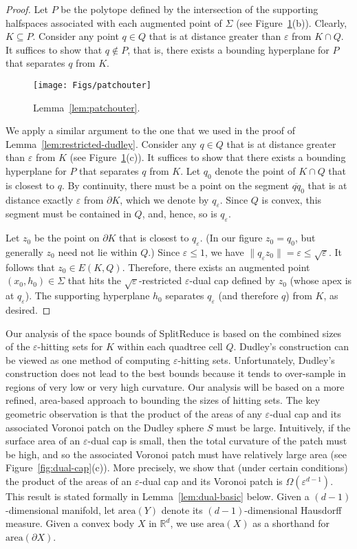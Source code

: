 \documentclass[11pt]{article}   \usepackage[letterpaper,hmargin=2.1cm,vmargin=3cm]{geometry}
\newcommand{\RE}{\mathbb{R}}    \newcommand{\ZZ}{\mathbb{Z}}    \newcommand{\eps}{\varepsilon}  \newcommand{\ST}{\,:\,}         \newcommand{\sq}{\square}
\newcommand{\alg}{\textrm{SplitReduce}}
\newcommand{\area}{\mathrm{area}}
\begin{document}
\begin{proof}
Let $P$ be the polytope defined by the intersection of the supporting halfspaces associated with each augmented point of $\Sigma$ (see Figure~\ref{fig:patchouter}(b)). Clearly, $K \subseteq P$. Consider any point $q \in Q$ that is at distance greater than $\eps$ from $K \cap Q$. It suffices to show that $q \notin P$, that is, there exists a bounding hyperplane for $P$ that separates $q$ from $K$. 

\begin{figure}[htbp]
  \centerline{\texttt{[image: Figs/patchouter]}}
  \caption{Lemma~\ref{lem:patchouter}.}
  \label{fig:patchouter}
\end{figure}


We apply a similar argument to the one that we used in the proof of Lemma~\ref{lem:restricted-dudley}. Consider any $q \in Q$ that is at distance greater than $\eps$ from $K$ (see Figure~\ref{fig:patchouter}(c)). It suffices to show that there exists a bounding hyperplane for $P$ that separates $q$ from $K$. Let $q_0$ denote the point of $K \cap Q$ that is closest to $q$. By continuity, there must be a point on the segment $\overline{q q}_0$ that is at distance exactly $\eps$ from $\partial K$, which we denote by $q_{\eps}$. Since $Q$ is convex, this segment must be contained in $Q$, and, hence, so is $q_{\eps}$. 

Let $z_0$ be the point on $\partial K$ that is closest to $q_{\eps}$. (In our figure $z_0 = q_0$, but generally $z_0$ need not lie within $Q$.) Since $\eps \le 1$, we have $\|q_{\eps} z_0\| = \eps \le \sqrt{\eps}$. It follows that $z_0 \in E(K,Q)$. Therefore, there exists an augmented point $(x_0,h_0) \in \Sigma$ that hits the $\sqrt{\eps}$-restricted $\eps$-dual cap defined by $z_0$ (whose apex is at $q_{\eps}$). The supporting hyperplane $h_0$ separates $q_{\eps}$ (and therefore $q$) from $K$, as desired.
\end{proof}


Our analysis of the space bounds of {\alg} is based on the combined sizes of the $\eps$-hitting sets for $K$ within each quadtree cell $Q$. Dudley's construction can be viewed as one method of computing $\eps$-hitting sets. Unfortunately, Dudley's construction does not lead to the best bounds because it tends to over-sample in regions of very low or very high curvature. Our analysis will be based on a more refined, area-based approach to bounding the sizes of hitting sets. The key geometric observation is that the product of the areas of any $\eps$-dual cap and its associated Voronoi patch on the Dudley sphere $S$ must be large. Intuitively, if the surface area of an $\eps$-dual cap is small, then the total curvature of the patch must be high, and so the associated Voronoi patch must have relatively large area (see Figure~\ref{fig:dual-cap}(c)). More precisely, we show that (under certain conditions) the product of the areas of an $\eps$-dual cap and its Voronoi patch is $\Omega(\eps^{d-1})$. This result is stated formally in Lemma~\ref{lem:dual-basic} below. Given a $(d-1)$-dimensional manifold, let $\area(Y)$ denote its $(d-1)$-dimensional Hausdorff measure. Given a convex body $X$ in $\RE^d$, we use $\area(X)$ as a shorthand for $\area(\partial X)$. 
\end{document}
